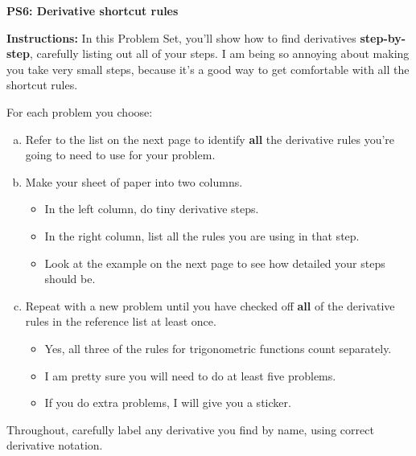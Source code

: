 \documentclass[letter, 12pt]{article}
\renewcommand{\section}[1]{\begin{center} \textbf{#1} \\\end{center}}
\begin{document}
\section{PS6: Derivative shortcut rules}

\textbf{Instructions:} 
In this Problem Set, you'll show how to find derivatives \textbf{step-by-step}, carefully listing out all of your steps. I am being so annoying about making you take very small steps, because it's a good way to get comfortable with all the shortcut rules.

For each problem you choose:
\begin{enumerate}[(a)]
	\item Refer to the list on the next page to identify \textbf{all} the derivative rules you're going to need to use for your problem.
    \item Make your sheet of paper into two columns. 
    \begin{itemize}
        \item In the left column, do tiny derivative steps. 
        \item In the right column, list all the rules you are using in that step.
        \item Look at the example on the next page to see how detailed your steps should be.
    \end{itemize}
	\item Repeat with a new problem until you have checked off \textbf{all} of the derivative rules in the reference list at least once.
    \begin{itemize}
        \item Yes, all three of the rules for trigonometric functions count separately.
        \item I am pretty sure you will need to do at least five problems.
        \item If you do extra problems, I will give you a sticker.
    \end{itemize}
\end{enumerate}
Throughout, carefully label any derivative you find by name, using correct derivative notation.
\vfill
\hrulefill
\end{document}
